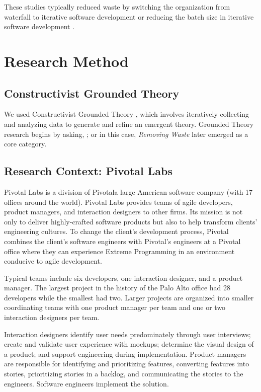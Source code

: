 These studies typically reduced waste by switching the organization from waterfall to iterative software development or reducing the batch size in iterative software development \cite{Ali2016, Khurum2014, Mujtaba2010}.
\section{Research Method}
\subsection{Constructivist Grounded Theory}
We used Constructivist Grounded Theory \cite{Charmaz}, which involves iteratively collecting and analyzing data to generate and refine an emergent theory. Grounded Theory research begins by asking,  \cite{GlaserTheoreticalSensitivity}; or in this case,  \textit{Removing Waste}  later emerged as a core category.
\subsection{Research Context: Pivotal Labs}
Pivotal Labs is a division of Pivotal\textemdash a large American software company (with 17 offices around the world). Pivotal Labs provides teams of agile developers, product managers, and interaction designers to other firms. Its mission is not only to deliver highly-crafted software products but also to help transform clients' engineering cultures. To change the client's development process, Pivotal combines the client's software engineers with Pivotal's engineers at a Pivotal office where they can experience Extreme Programming in an environment conducive to agile development. 

Typical teams include six developers, one interaction designer, and a product manager. The largest project in the history of the Palo Alto office had 28 developers while the smallest had two. Larger projects are organized into smaller coordinating teams with one product manager per team and one or two interaction designers per team.

Interaction designers identify user needs predominately through user interviews; create and validate user experience with mockups; determine the visual design of a product; and support engineering during implementation. Product managers are responsible for identifying and prioritizing features, converting features into stories, prioritizing stories in a backlog, and communicating the stories to the engineers. Software engineers implement the solution. 

